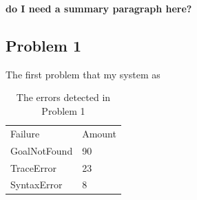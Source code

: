 {\color{red} \textbf{ do I need a summary paragraph here?}}

\subsection{Problem 1}

The first problem that my system as


\begin{table}[htbp]
\caption{The errors detected in Problem 1}
\begin{tabular}{ll}
Failure      & Amount \\
GoalNotFound & 90     \\
TraceError   & 23     \\
SyntaxError  & 8     
\end{tabular}
\end{table}










